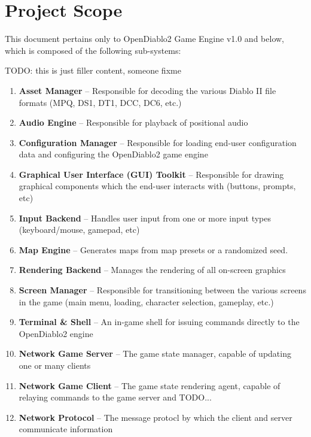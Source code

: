 \section{Project Scope} \label{sec:productscope}


This document pertains only to OpenDiablo2 Game Engine v1.0 and below, which 
is composed of the following sub-systems:

TODO: this is just filler content, someone fixme
\begin{enumerate}
\item \textbf{Asset Manager} -- Responsible for decoding the various Diablo II file formats (MPQ, DS1, DT1, DCC, DC6, etc.)
\item \textbf{Audio Engine} -- Responsible for playback of positional audio
\item \textbf{Configuration Manager} -- Responsible for loading end-user configuration data and configuring the OpenDiablo2 game engine
\item \textbf{Graphical User Interface (GUI) Toolkit} -- Responsible for drawing graphical components which the end-user interacts with (buttons, prompts, etc)
\item \textbf{Input Backend} -- Handles user input from one or more input types (keyboard/mouse, gamepad, etc)
\item \textbf{Map Engine} -- Generates maps from map presets or a randomized seed.
\item \textbf{Rendering Backend} -- Manages the rendering of all on-screen graphics
\item \textbf{Screen Manager} -- Responsible for transitioning between the various screens in the game (main menu, loading, character selection, gameplay, etc.)
\item \textbf{Terminal \& Shell} -- An in-game shell for issuing commands directly to the OpenDiablo2 engine
\item \textbf{Network Game Server} -- The game state manager, capable of updating one or many clients
\item \textbf{Network Game Client} -- The game state rendering agent, capable of relaying commands to the game server and TODO...
\item \textbf{Network Protocol} -- The message protocl by which the client and server communicate information
\end{enumerate}
